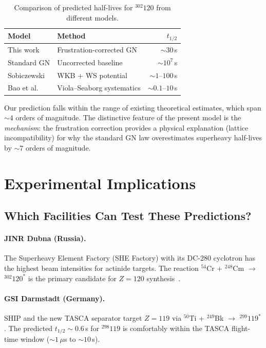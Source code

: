 \documentclass[12pt,a4paper,twocolumn]{revtex4-2}
\newcommand{\thalf}{t_{1/2}}
\begin{document}
\begin{table}[h]
\centering
\caption{Comparison of predicted half-lives for ${}^{302}120$
  from different models.}
\label{tab:comparison}
\begin{tabular}{@{}llr@{}}
\toprule
Model & Method & $\thalf$ \\
\midrule
This work & Frustration-corrected GN & $\sim 30$\,s \\
Standard GN & Uncorrected baseline & $\sim 10^7$\,s \\
Sobiczewski~\cite{Sobiczewski2018} & WKB + WS potential & $\sim 1$--$100$\,s \\
Bao et al.~\cite{Bao2015} & Viola--Seaborg systematics & $\sim 0.1$--$10$\,s \\
\bottomrule
\end{tabular}
\end{table}

Our prediction falls within the range of existing theoretical
estimates, which span $\sim 4$ orders of magnitude.  The
distinctive feature of the present model is the
\emph{mechanism}: the frustration correction provides a
physical explanation (lattice incompatibility) for why the
standard GN law overestimates superheavy half-lives by
$\sim 7$ orders of magnitude.

\section{Experimental Implications}
\label{sec:experiment}

\subsection{Which Facilities Can Test These Predictions?}

\paragraph{JINR Dubna (Russia).}
The Superheavy Element Factory (SHE Factory) with its
DC-280 cyclotron has the highest beam intensities for
actinide targets.  The reaction ${}^{54}$Cr +
${}^{248}$Cm $\to$ ${}^{302}120^*$ is the primary
candidate for $Z = 120$ synthesis~\cite{Oganessian2020}.

\paragraph{GSI Darmstadt (Germany).}
SHIP and the new TASCA separator target $Z = 119$ via
${}^{50}$Ti + ${}^{249}$Bk $\to$ ${}^{299}119^*$.
The predicted $\thalf \sim 0.6$\,s for ${}^{298}119$
is comfortably within the TASCA flight-time
window ($\sim 1$\,$\mu$s to $\sim 10$\,s).
\end{document}
